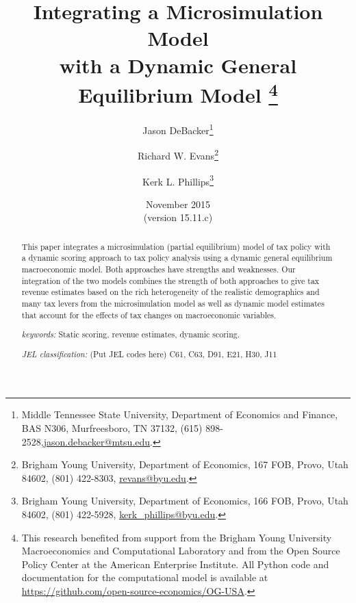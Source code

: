 \documentclass[letterpaper,12pt]{article}
\theoremstyle{definition}
\begin{document}
\begin{titlepage}
\title{Integrating a Microsimulation Model \\
       with a Dynamic General Equilibrium Model
       \thanks{This research benefited from support from the Brigham Young University Macroeconomics and Computational Laboratory and from the Open Source Policy Center at the American Enterprise Institute. All Python code and documentation for the computational model is available at \href{https://github.com/open-source-economics/OG-USA}{https://github.com/open-source-economics/OG-USA}.}
       }
\author{
  Jason DeBacker\footnote{Middle Tennessee State University, Department of Economics and Finance, BAS N306, Murfreesboro, TN 37132, (615) 898-2528,\href{mailto:jason.debacker@mtsu.edu}{jason.debacker@mtsu.edu}.} \\[-2pt]
  \and
  Richard W. Evans\footnote{Brigham Young University, Department of Economics, 167 FOB, Provo, Utah 84602, (801) 422-8303, \href{mailto:revans@byu.edu}{revans@byu.edu}.} \\[-2pt]
  \and
  Kerk L. Phillips\footnote{Brigham Young University, Department of Economics, 166 FOB, Provo, Utah 84602, (801) 422-5928, \href{mailto:kerk_phillips@byu.edu}{kerk\_phillips@byu.edu}.}}
\date{November 2015 \\
  \scriptsize{(version 15.11.c)}}
\maketitle
\vspace{-9mm}
\begin{abstract}
\small{This paper integrates a microsimulation (partial equilibrium) model of tax policy with a dynamic scoring approach to tax policy analysis using a dynamic general equilibrium macroeconomic model. Both approaches have strengths and weaknesses. Our integration of the two models combines the strength of both approaches to give tax revenue estimates based on the rich heterogeneity of the realistic demographics and many tax levers from the microsimulation model as well as dynamic model estimates that account for the effects of tax changes on macroeconomic variables.

\vspace{3mm}

\noindent\textit{keywords:}\: Static scoring, revenue estimates, dynamic scoring.

\vspace{3mm}

\noindent\textit{JEL classification:} (Put JEL codes here) C61, C63, D91, E21, H30, J11}
\end{abstract}
\thispagestyle{empty}
\end{titlepage}
\end{document}
